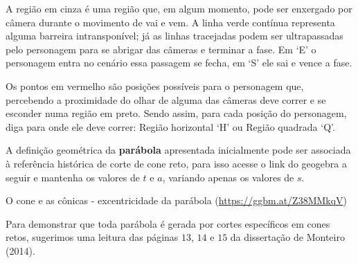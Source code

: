 A região em cinza é uma região que, em algum momento, pode ser enxergado por câmera durante o movimento de vai e vem. A linha verde contínua representa alguma barreira intransponível; já as linhas tracejadas podem ser ultrapassadas pelo personagem para se abrigar das câmeras e terminar a fase. Em ‘E’ o personagem entra no cenário essa passagem se fecha, em ‘S’ ele sai e vence a fase.

Os pontos em vermelho são posições possíveis para o personagem que, percebendo a proximidade do olhar de alguma das câmeras deve correr e se esconder numa região em preto. Sendo assim, para cada posição do personagem, diga para onde ele deve correr: Região horizontal ‘H’ ou Região quadrada ‘Q’.

\begin{research}{}

A definição geométrica da \textbf{parábola} apresentada inicialmente pode ser associada à referência histórica de corte de cone reto, para isso acesse o link do geogebra a seguir e mantenha os valores de \(t\) e \(a\), variando apenas os valores de \(s\).

O cone e as cônicas - excentricidade da parábola (\url{https://ggbm.at/Z38MMkqV})

Para demonstrar que toda parábola é gerada por cortes específicos em cones retos, sugerimos uma leitura das páginas \(13\), \(14\) e \(15\) da dissertação de Monteiro (2014).
\end{research}


